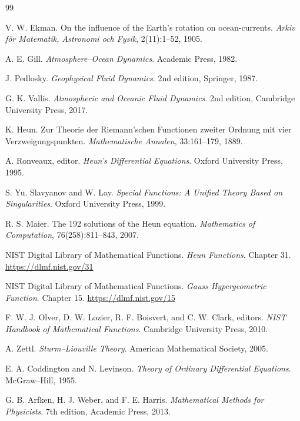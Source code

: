 \documentclass[10pt]{amsart}
\begin{document}
\begin{thebibliography}{99}

V. W. Ekman.
\newblock On the influence of the Earth's rotation on ocean-currents.
\newblock \emph{Arkiv f\"or Matematik, Astronomi och Fysik}, 2(11):1--52, 1905.

A. E. Gill.
\newblock \emph{Atmosphere--Ocean Dynamics}.
\newblock Academic Press, 1982.

J. Pedlosky.
\newblock \emph{Geophysical Fluid Dynamics}.
\newblock 2nd edition, Springer, 1987.

G. K. Vallis.
\newblock \emph{Atmospheric and Oceanic Fluid Dynamics}.
\newblock 2nd edition, Cambridge University Press, 2017.

K. Heun.
\newblock Zur Theorie der Riemann'schen Functionen zweiter Ordnung mit vier Verzweigungspunkten.
\newblock \emph{Mathematische Annalen}, 33:161--179, 1889.

A. Ronveaux, editor.
\newblock \emph{Heun's Differential Equations}.
\newblock Oxford University Press, 1995.

S. Yu. Slavyanov and W. Lay.
\newblock \emph{Special Functions: A Unified Theory Based on Singularities}.
\newblock Oxford University Press, 1999.

R. S. Maier.
\newblock The 192 solutions of the Heun equation.
\newblock \emph{Mathematics of Computation}, 76(258):811--843, 2007.

NIST Digital Library of Mathematical Functions.
\newblock \emph{Heun Functions}.
\newblock Chapter 31.
\newblock \url{https://dlmf.nist.gov/31}

NIST Digital Library of Mathematical Functions.
\newblock \emph{Gauss Hypergeometric Function}.
\newblock Chapter 15.
\newblock \url{https://dlmf.nist.gov/15}

F. W. J. Olver, D. W. Lozier, R. F. Boisvert, and C. W. Clark, editors.
\newblock \emph{NIST Handbook of Mathematical Functions}.
\newblock Cambridge University Press, 2010.

A. Zettl.
\newblock \emph{Sturm--Liouville Theory}.
\newblock American Mathematical Society, 2005.

E. A. Coddington and N. Levinson.
\newblock \emph{Theory of Ordinary Differential Equations}.
\newblock McGraw--Hill, 1955.

G. B. Arfken, H. J. Weber, and F. E. Harris.
\newblock \emph{Mathematical Methods for Physicists}.
\newblock 7th edition, Academic Press, 2013.

\end{thebibliography}
\end{document}
